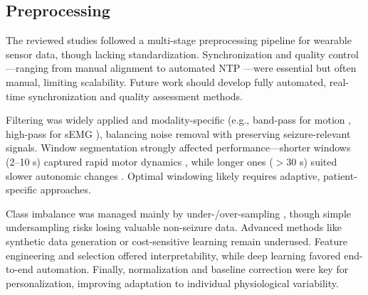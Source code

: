 \subsection{Preprocessing}
The reviewed studies followed a multi-stage preprocessing pipeline for wearable sensor data, though lacking standardization. Synchronization and quality control—ranging from manual alignment \cite{Yu2023-ss} to automated NTP \cite{Vakilna2024-hk}—were essential but often manual, limiting scalability. Future work should develop fully automated, real-time synchronization and quality assessment methods.

Filtering was widely applied and modality-specific (e.g., band-pass for motion \cite{Wu2024-yl, De_Cooman2018-pq}, high-pass for sEMG \cite{Milosevic2016-ee}), balancing noise removal with preserving seizure-relevant signals. Window segmentation strongly affected performance—shorter windows (2–10 s) captured rapid motor dynamics \cite{Milosevic2016-ee, Larsen2024-vn}, while longer ones ($>$30 s) suited slower autonomic changes \cite{Meisel2020-ii, Jiang2022-zu}. Optimal windowing likely requires adaptive, patient-specific approaches.

Class imbalance was managed mainly by under-/over-sampling \cite{Yu2023-ss, Tang2021-td, Larsen2024-vn}, though simple undersampling risks losing valuable non-seizure data. Advanced methods like synthetic data generation or cost-sensitive learning remain underused. Feature engineering and selection \cite{Ge2023-ab, Xu2022-tx} offered interpretability, while deep learning favored end-to-end automation. Finally, normalization and baseline correction \cite{Jiang2022-zu, Nasseri2021-xn} were key for personalization, improving adaptation to individual physiological variability.